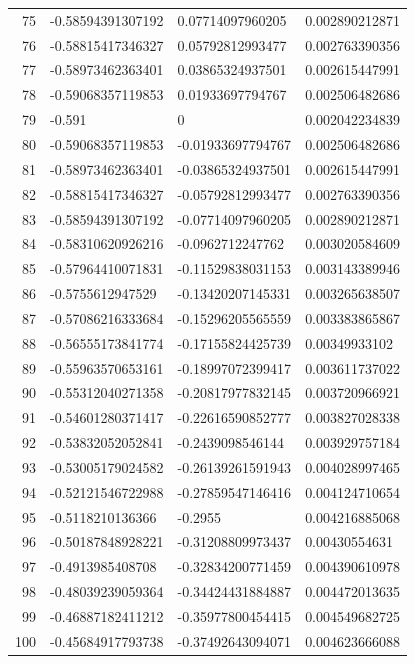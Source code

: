 \documentclass{amsart}
\numberwithin{equation}{section}
\numberwithin{table}{section}
\begin{document}
\begin{longtable}{@{}rlll@{}}
75 & -0.58594391307192 & 0.07714097960205 & 0.002890212871 \\
76 & -0.58815417346327 & 0.05792812993477 & 0.002763390356 \\
77 & -0.58973462363401 & 0.03865324937501 & 0.002615447991 \\
78 & -0.59068357119853 & 0.01933697794767 & 0.002506482686 \\
79 & -0.591 & 0 & 0.002042234839 \\
80 & -0.59068357119853 & -0.01933697794767 & 0.002506482686 \\
81 & -0.58973462363401 & -0.03865324937501 & 0.002615447991 \\
82 & -0.58815417346327 & -0.05792812993477 & 0.002763390356 \\
83 & -0.58594391307192 & -0.07714097960205 & 0.002890212871 \\
84 & -0.58310620926216 & -0.0962712247762 & 0.003020584609 \\
85 & -0.57964410071831 & -0.11529838031153 & 0.003143389946 \\
86 & -0.5755612947529 & -0.13420207145331 & 0.003265638507 \\
87 & -0.57086216333684 & -0.15296205565559 & 0.003383865867 \\
88 & -0.56555173841774 & -0.17155824425739 & 0.00349933102 \\
89 & -0.55963570653161 & -0.18997072399417 & 0.003611737022 \\
90 & -0.55312040271358 & -0.20817977832145 & 0.003720966921 \\
91 & -0.54601280371417 & -0.22616590852777 & 0.003827028338 \\
92 & -0.53832052052841 & -0.2439098546144 & 0.003929757184 \\
93 & -0.53005179024582 & -0.26139261591943 & 0.004028997465 \\
94 & -0.52121546722988 & -0.27859547146416 & 0.004124710654 \\
95 & -0.5118210136366 & -0.2955 & 0.004216885068 \\
96 & -0.50187848928221 & -0.31208809973437 & 0.00430554631 \\
97 & -0.4913985408708 & -0.32834200771459 & 0.004390610978 \\
98 & -0.48039239059364 & -0.34424431884887 & 0.004472013635 \\
99 & -0.46887182411212 & -0.35977800454415 & 0.004549682725 \\
100 & -0.45684917793738 & -0.37492643094071 & 0.004623666088 \\

\end{longtable}
\end{document}
